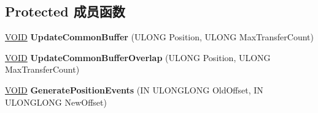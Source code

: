 \subsection*{Protected 成员函数}
\begin{DoxyCompactItemize}
\item 
\mbox{\label{class_c_port_pin_wave_cyclic_aa5e8448ace1df23021716650d9c13535}} 
\hyperlink{interfacevoid}{V\+O\+ID} {\bfseries Update\+Common\+Buffer} (U\+L\+O\+NG Position, U\+L\+O\+NG Max\+Transfer\+Count)
\item 
\mbox{\label{class_c_port_pin_wave_cyclic_aaa88db50217990c1ceac4f37b78d451b}} 
\hyperlink{interfacevoid}{V\+O\+ID} {\bfseries Update\+Common\+Buffer\+Overlap} (U\+L\+O\+NG Position, U\+L\+O\+NG Max\+Transfer\+Count)
\item 
\mbox{\label{class_c_port_pin_wave_cyclic_a12b34019a45af6ded42fa93de3bbdcbc}} 
\hyperlink{interfacevoid}{V\+O\+ID} {\bfseries Generate\+Position\+Events} (IN U\+L\+O\+N\+G\+L\+O\+NG Old\+Offset, IN U\+L\+O\+N\+G\+L\+O\+NG New\+Offset)
\end{DoxyCompactItemize}
